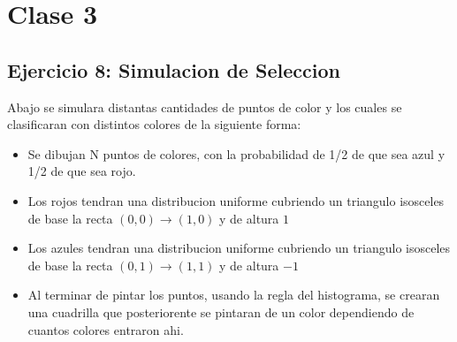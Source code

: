 \documentclass[12pt, a4paper]{article}
\begin{document}
\section{Clase 3}
\subsection{Ejercicio 8: Simulacion de Seleccion}

Abajo se simulara distantas cantidades de puntos de color y los cuales se clasificaran con distintos colores de la siguiente forma:
\begin{itemize}
	\item Se dibujan N puntos de colores, con la probabilidad de 1/2 de que sea azul y 1/2 de que sea rojo.
	\item Los rojos tendran una distribucion uniforme cubriendo un triangulo isosceles de base la recta $(0,0)\rightarrow(1,0)$ y de altura $1$
	\item Los azules tendran una distribucion uniforme cubriendo un triangulo isosceles de base la recta $(0,1)\rightarrow(1,1)$ y de altura $-1$
	\item Al terminar de pintar los puntos, usando la regla del histograma, se crearan una cuadrilla que posteriorente se pintaran de un color dependiendo de cuantos colores entraron ahi.
\end{itemize}
\end{document}
